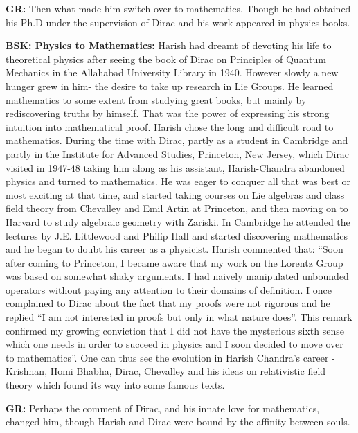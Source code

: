 \textbf{GR:} Then what made him switch over to mathematics. Though he had obtained his Ph.D under the supervision of Dirac and his work appeared in physics books.

\textbf{BSK: Physics to Mathematics:}  Harish had dreamt of devoting his life to theoretical physics after seeing the book of Dirac on Principles of Quantum Mechanics in the Allahabad University Library in 1940. However slowly a new hunger grew in him- the desire to take up research in Lie Groups. He learned mathematics to some extent from studying great books, but mainly by rediscovering truths by himself. That was the power of expressing his strong intuition into mathematical proof. Harish chose the long and difficult road to mathematics. During the time with Dirac, partly as a student in Cambridge and partly in the Institute for Advanced Studies, Princeton, New Jersey, which Dirac visited in 1947-48 taking him along as his assistant, Harish-Chandra abandoned physics and turned to mathematics. He was eager to conquer all that was best or most exciting at that time, and started taking courses on Lie algebras and class field theory from Chevalley and Emil Artin at Princeton, and then moving on to Harvard to study algebraic geometry with Zariski. In Cambridge he attended the lectures by J.E. Littlewood and Philip Hall and started discovering mathematics and he began to doubt his career as a physicist. Harish commented that: “Soon after coming to Princeton, I became aware that my work on the Lorentz Group was based on somewhat shaky arguments.  I had naively manipulated unbounded operators without paying any attention to their domains of definition. I once complained to Dirac about the fact that my proofs were not rigorous and he replied “I am not interested in proofs but only in what nature does”.  This remark confirmed my growing conviction that I did not have the mysterious sixth sense which one needs in order to succeed in physics and I soon decided to move over to mathematics”. One can thus see the evolution in Harish Chandra’s career - Krishnan, Homi Bhabha, Dirac, Chevalley and his ideas on relativistic field theory which found its way into some famous texts.

\textbf{GR:} Perhaps the comment of Dirac, and his innate love for mathematics, changed him, though Harish and Dirac were bound by the affinity between souls.

